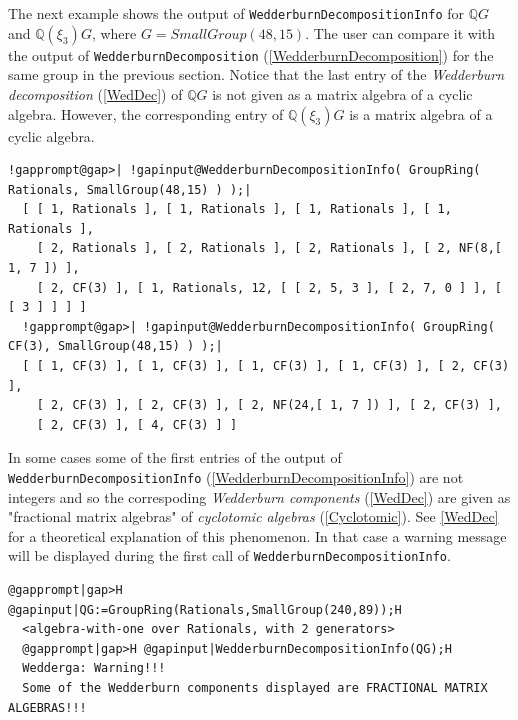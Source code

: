 \documentclass[a4paper,11pt]{report}
\begin{document}
{{ The next example shows the output of \texttt{WedderburnDecompositionInfo} for ${\ensuremath{\mathbb Q}} G$ and ${\ensuremath{\mathbb Q}} (\xi_3) G$, where $G=SmallGroup(48,15)$. The user can compare it with the output of \texttt{WedderburnDecomposition} (\ref{WedderburnDecomposition}) for the same group in the previous section. Notice that the last entry of the \emph{Wedderburn decomposition} (\ref{WedDec}) of ${\ensuremath{\mathbb Q}} G$ is not given as a matrix algebra of a cyclic algebra. However, the
corresponding entry of ${\ensuremath{\mathbb Q}} (\xi_3) G$ is a matrix algebra of a cyclic algebra. 
\begin{Verbatim}[commandchars=!@|,fontsize=\small,frame=single,label=Example]
  !gapprompt@gap>| !gapinput@WedderburnDecompositionInfo( GroupRing( Rationals, SmallGroup(48,15) ) );|
  [ [ 1, Rationals ], [ 1, Rationals ], [ 1, Rationals ], [ 1, Rationals ], 
    [ 2, Rationals ], [ 2, Rationals ], [ 2, Rationals ], [ 2, NF(8,[ 1, 7 ]) ],
    [ 2, CF(3) ], [ 1, Rationals, 12, [ [ 2, 5, 3 ], [ 2, 7, 0 ] ], [ [ 3 ] ] ] ]
  !gapprompt@gap>| !gapinput@WedderburnDecompositionInfo( GroupRing( CF(3), SmallGroup(48,15) ) );|
  [ [ 1, CF(3) ], [ 1, CF(3) ], [ 1, CF(3) ], [ 1, CF(3) ], [ 2, CF(3) ], 
    [ 2, CF(3) ], [ 2, CF(3) ], [ 2, NF(24,[ 1, 7 ]) ], [ 2, CF(3) ], 
    [ 2, CF(3) ], [ 4, CF(3) ] ]
\end{Verbatim}
 In some cases some of the first entries of the output of \texttt{WedderburnDecompositionInfo} (\ref{WedderburnDecompositionInfo}) are not integers and so the correspoding \emph{Wedderburn components} (\ref{WedDec}) are given as "fractional matrix algebras" of \emph{cyclotomic algebras} (\ref{Cyclotomic}). See \ref{WedDec} for a theoretical explanation of this phenomenon. In that case a warning
message will be displayed during the first call of \texttt{WedderburnDecompositionInfo}. 
\begin{Verbatim}[commandchars=@|H,fontsize=\small,frame=single,label=Example]
  @gapprompt|gap>H @gapinput|QG:=GroupRing(Rationals,SmallGroup(240,89));H
  <algebra-with-one over Rationals, with 2 generators>
  @gapprompt|gap>H @gapinput|WedderburnDecompositionInfo(QG);H
  Wedderga: Warning!!! 
  Some of the Wedderburn components displayed are FRACTIONAL MATRIX ALGEBRAS!!!
  

\end{Verbatim}}}
\end{document}
